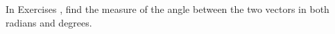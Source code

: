 {\noindent In Exercises}
{, find the measure of the angle between the two vectors in both radians and degrees.
}
